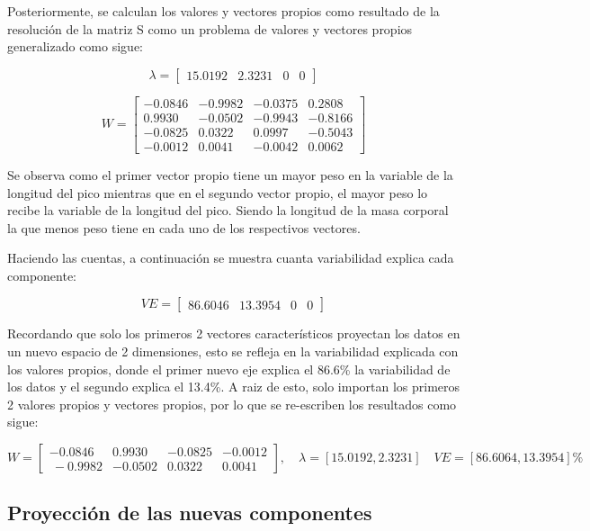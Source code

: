 \documentclass[11pt, letterpaper]{article}
\begin{document}
Posteriormente, se calculan los valores y vectores propios como resultado de la resolución de la matriz S como un problema de valores y vectores propios generalizado como sigue:

$$\lambda = 
\begin{bmatrix}
	15.0192 &
	2.3231 &
	0 &
	0 
\end{bmatrix}
$$

$$ W = 
\begin{bmatrix}
-0.0846 & -0.9982 & -0.0375 & 0.2808 \\
0.9930 & -0.0502 & -0.9943 & -0.8166 \\
-0.0825 & 0.0322 & 0.0997 & -0.5043 \\
-0.0012 & 0.0041 & -0.0042 & 0.0062
\end{bmatrix}
$$

Se observa como el primer vector propio tiene un mayor peso en la variable de la longitud del pico mientras que en el segundo vector propio, el mayor peso lo recibe la variable de la longitud del pico. Siendo la longitud de la masa corporal la que menos peso tiene en cada uno de los respectivos vectores.

Haciendo las cuentas, a continuación se muestra cuanta variabilidad explica cada componente:

$$VE = 
\begin{bmatrix}
	86.6046  &
	13.3954  &
	0 &
	0 
\end{bmatrix}
$$

Recordando que solo los primeros 2 vectores característicos proyectan los datos en un nuevo espacio de 2 dimensiones, esto se refleja en la variabilidad explicada con los valores propios, donde el primer nuevo eje explica el 86.6\% la variabilidad de los datos y el segundo explica el 13.4\%. A raiz de esto, solo importan los primeros 2 valores propios y vectores propios, por lo que se re-escriben los resultados como sigue:

 
 



$$ W = 
\begin{bmatrix}
	-0.0846 & 0.9930 & -0.0825 & -0.0012  \\\
	-0.9982 & -0.0502 & 0.0322  & 0.0041
\end{bmatrix}, \quad \lambda =[15.0192, 2.3231] \quad VE = [86.6064, 13.3954]\%
$$



\newpage

\subsection{Proyección de las nuevas componentes}
\end{document}
